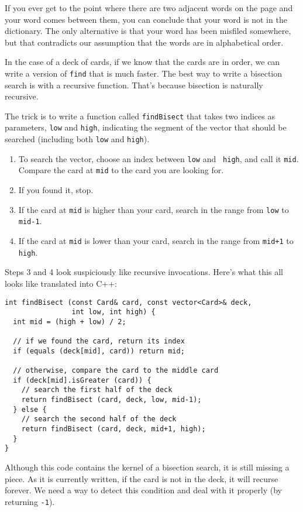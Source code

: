 If you ever get to the point where there are two adjacent words on the
page and your word comes between them, you can conclude that your word
is not in the dictionary.  The only alternative is that your word has
been misfiled somewhere, but that contradicts our assumption that the
words are in alphabetical order.

In the case of a deck of cards, if we know that the cards are in
order, we can write a version of {\tt find} that is much faster.  The
best way to write a bisection search is with a recursive function.
That's because bisection is naturally recursive.


The trick is to write a function called {\tt findBisect} that takes
two indices as parameters, {\tt low} and {\tt high}, indicating the
segment of the vector that should be searched (including both
{\tt low} and {\tt high}).

\begin{enumerate}

\item To search the vector, choose an index between {\tt low} and {\tt
high}, and call it {\tt mid}.  Compare the card at {\tt mid} to the
card you are looking for.

\item If you found it, stop.

\item If the card at {\tt mid} is higher than your card, search
in the range from {\tt low} to {\tt mid-1}.

\item If the card at {\tt mid} is lower than your card, search
in the range from {\tt mid+1} to {\tt high}.

\end{enumerate}
%
Steps 3 and 4 look suspiciously like recursive
invocations.  Here's what this all looks like translated into
C++:

\begin{verbatim}
int findBisect (const Card& card, const vector<Card>& deck,
                int low, int high) {
  int mid = (high + low) / 2;

  // if we found the card, return its index
  if (equals (deck[mid], card)) return mid;

  // otherwise, compare the card to the middle card
  if (deck[mid].isGreater (card)) {
    // search the first half of the deck
    return findBisect (card, deck, low, mid-1);
  } else {
    // search the second half of the deck
    return findBisect (card, deck, mid+1, high);
  }
}
\end{verbatim}
%
Although this code contains the kernel of a bisection search, it
is still missing a piece.  As it is currently written,
if the card is not in the deck, it will recurse forever.  We
need a way to detect this condition and deal with it properly
(by returning {\tt -1}).

